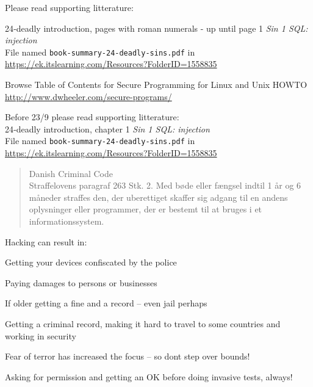 \documentclass[Screen16to9,17pt]{foils}
\begin{document}

Please read supporting litterature:
\begin{list2}
\item 24‑deadly introduction, pages with roman numerals - up until page 1 \emph{Sin 1 SQL: injection}\\
File named \verb+book-summary-24-deadly-sins.pdf+ in \url{https://ek.itslearning.com/Resources?FolderID=1558835}
\item Browse Table of Contents for Secure Programming for Linux and Unix HOWTO\\
\url{http://www.dwheeler.com/secure-programs/}
\end{list2}

\begin{list2}
\item
Before 23/9 please read supporting litterature:\\
24‑deadly introduction, chapter 1 \emph{Sin 1 SQL: injection}\\
File named \verb+book-summary-24-deadly-sins.pdf+ in \url{https://ek.itslearning.com/Resources?FolderID=1558835}
\end{list2}



\begin{quote}\small
Danish Criminal Code\\
Straffelovens paragraf 263 Stk. 2. Med bøde eller fængsel indtil 1 år og 6 måneder straffes den, der uberettiget skaffer sig adgang til en andens oplysninger eller programmer, der er bestemt til at bruges i et informationssystem.
\end{quote}

Hacking can result in:
\begin{list2}
\item Getting your devices confiscated by the police
\item Paying damages to persons or businesses
\item If older getting a fine and a record -- even jail perhaps
\item Getting a criminal record, making it hard to travel to some countries and working in security
\item Fear of terror has increased the focus -- so dont step over bounds!
\end{list2}

Asking for permission and getting an OK before doing invasive tests, always!
\end{document}
